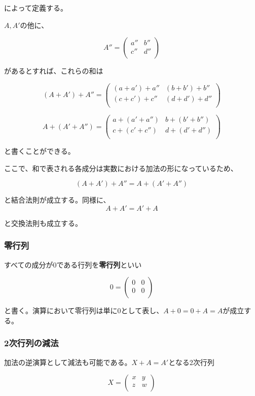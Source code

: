 \documentclass[dvipdfmx,autodetect-engine]{jsarticle}
\theoremstyle{definition}
\begin{document}
によって定義する。

$A,A'$の他に、

$$
A'' = \begin{pmatrix}
a'' & b'' \\
c'' & d'' \\
\end{pmatrix}
$$

があるとすれば、これらの和は

$$
(A + A') + A'' = \begin{pmatrix}
(a + a') + a'' & (b + b') + b'' \\
(c + c') + c'' & (d + d') + d'' \\
\end{pmatrix}
$$

$$
A + (A' + A'') = \begin{pmatrix}
a + (a' + a'') & b + (b' + b'') \\
c + (c' + c'') & d + (d' + d'') \\
\end{pmatrix}
$$

と書くことができる。

ここで、和で表される各成分は実数における加法の形になっているため、

$$
(A + A') + A'' = A + (A' + A'')
$$

と結合法則が成立する。同様に、
$$
A + A' = A' + A
$$

と交換法則も成立する。

\subsubsection{零行列}

すべての成分が0である行列を{\bf 零行列}といい

$$
0 = \begin{pmatrix}
0 & 0 \\
0 & 0 \\
\end{pmatrix}
$$

と書く。演算において零行列は単に$0$として表し、$A + 0 = 0 + A = A$が成立する。

\subsubsection{2次行列の減法}

加法の逆演算として減法も可能である。$X + A = A'$となる2次行列

$$
X = \begin{pmatrix}
x & y \\
z & w \\
\end{pmatrix}
$$
\end{document}
